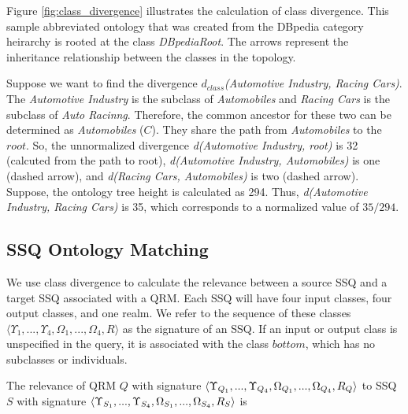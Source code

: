 Figure \ref{fig:class_divergence} illustrates the calculation of class
divergence. This sample abbreviated ontology that was created from the
DBpedia category heirarchy is rooted at the class
\textit{DBpediaRoot}. The arrows represent the inheritance
relationship between the classes in the topology.

Suppose we want to find the divergence $d_{class}$\textit{(Automotive
  Industry, Racing Cars)}. The \textit{Automotive Industry} is the
subclass of \textit{Automobiles} and \textit{Racing Cars} is the
subclass of \textit{Auto Racinng}. Therefore, the common ancestor for
these two can be determined as \textit{Automobiles} ($C$). They share
the path from \textit{Automobiles} to the $root$. So, the unnormalized
divergence \textit{d(Automotive Industry, root)} is 32 (calcuted from
the path to root), \textit{d(Automotive Industry, Automobiles)} is one
(dashed arrow), and \textit{d(Racing Cars, Automobiles)} is two
(dashed arrow). Suppose, the ontology tree height is calculated as
294. Thus, \textit{d(Automotive Industry, Racing Cars)} is 35, which
corresponds to a normalized value of $35/294$.

\subsection{SSQ Ontology Matching}
\label{sec:oqom}

We use class divergence to calculate the relevance between a source
SSQ and a target SSQ associated with a QRM.  Each SSQ will have four
input classes, four output classes, and one realm.  We refer to the
sequence of these classes $\langle \Upsilon_1, ..., \Upsilon_4,
\Omega_1, ..., \Omega_4, R \rangle$ as the signature of an SSQ. If an
input or output class is unspecified in the query, it is associated
with the class $bottom$, which has no subclasses or individuals.

The relevance of QRM $Q$ with signature $\langle \Upsilon_{Q_1}, ...,
\Upsilon_{Q_4}, \\\Omega_{Q_1}, ... , \Omega_{Q_4}, R_Q\rangle$ to SSQ
$S$ with signature $\langle \Upsilon_{S_1}, ..., \Upsilon_{S_4},
\\\Omega_{S_1}, ... , \Omega_{S_4}, R_S \rangle$ is

